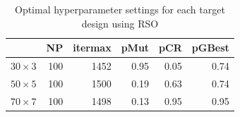\documentclass [PhD] {package/uclathes}
\begin{document}
\begin{table}

\caption{\label{tab:rso_optim}Optimal hyperparameter settings for each target design using RSO}
\centering
\begin{tabular}[t]{l|r|r|r|r|r}
\hline
  & NP & itermax & pMut & pCR & pGBest\\
\hline
$30\times3$ & 100 & 1452 & 0.95 & 0.05 & 0.74\\
\hline
$50\times5$ & 100 & 1500 & 0.19 & 0.63 & 0.74\\
\hline
$70\times7$ & 100 & 1498 & 0.13 & 0.95 & 0.95\\
\hline
\end{tabular}
\end{table}
\end{document}
